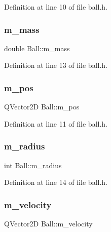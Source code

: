 Definition at line 10 of file ball.\+h.

\mbox{\label{class_ball_ac1cab784df7b44bc48d236657c28a199}} 
\subsubsection{\texorpdfstring{m\+\_\+mass}{m\_mass}}
{\footnotesize\ttfamily double Ball\+::m\+\_\+mass\hspace{0.3cm}{\ttfamily [protected]}}



Definition at line 13 of file ball.\+h.

\mbox{\label{class_ball_a50924825251df59b5715b123ac5f6395}} 
\subsubsection{\texorpdfstring{m\+\_\+pos}{m\_pos}}
{\footnotesize\ttfamily Q\+Vector2D Ball\+::m\+\_\+pos\hspace{0.3cm}{\ttfamily [protected]}}



Definition at line 11 of file ball.\+h.

\mbox{\label{class_ball_a5121dd03edea304520c4e9f286be67c0}} 
\subsubsection{\texorpdfstring{m\+\_\+radius}{m\_radius}}
{\footnotesize\ttfamily int Ball\+::m\+\_\+radius\hspace{0.3cm}{\ttfamily [protected]}}



Definition at line 14 of file ball.\+h.

\mbox{\label{class_ball_a7c207fe7385c8d519ac85e8e6c9ceae5}} 
\subsubsection{\texorpdfstring{m\+\_\+velocity}{m\_velocity}}
{\footnotesize\ttfamily Q\+Vector2D Ball\+::m\+\_\+velocity\hspace{0.3cm}{\ttfamily [protected]}}



